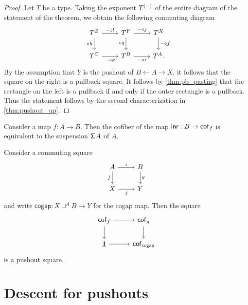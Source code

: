 \begin{proof}
Let $T$ be a type. Taking the exponent $T^{(\mathord{\hspace{1pt}\text{--}\hspace{1pt}})}$ of the entire diagram of the statement of the theorem, we obtain the following commuting diagram
\begin{equation*}
\begin{tikzcd}
T^Z \arrow[r,"\blank\circ l"] \arrow[d,swap,"\blank\circ h"] & T^Y \arrow[d,swap,"\blank\circ g"] \arrow[r,"\blank\circ j"] & T^X \arrow[d,"\blank\circ f"] \\
T^C \arrow[r,swap,"\blank\circ k"] & T^B \arrow[r,swap,"\blank\circ i"] & T^A.
\end{tikzcd}
\end{equation*}
By the assumption that $Y$ is the pushout of $B\leftarrow A \rightarrow X$, it follows that the square on the right is a pullback square. It follows by \autoref{thm:pb_pasting} that the rectangle on the left is a pullback if and only if the outer rectangle is a pullback. Thus the statement follows by the second characterization in \autoref{thm:pushout_up}.
\end{proof}

\begin{lem}
Consider a map $f:A\to B$. Then the cofiber of the map ${\mathsf{inr}}:B\to \mathsf{cof}_f$ is equivalent to the suspension $\mathsf{\Sigma}^{}{A}$ of $A$. 
\end{lem}

\begin{prp}
Consider a commuting square
\begin{equation*}
\begin{tikzcd}
A \arrow[r,"i"] \arrow[d,swap,"f"] & B \arrow[d,"g"] \\
X \arrow[r,swap,"j"] & Y
\end{tikzcd}
\end{equation*}
and write $\mathsf{cogap}: X\sqcup^A B\to Y$ for the cogap map. 
Then the square
\begin{equation*}
\begin{tikzcd}
\mathsf{cof}_f \arrow[d] \arrow[r] & \mathsf{cof}_g \arrow[d] \\
\unit \arrow[r] & \mathsf{cof}_{\mathsf{cogap}}
\end{tikzcd}
\end{equation*}
is a pushout square.
\end{prp}

\section{Descent for pushouts}\label{sec:descent}

